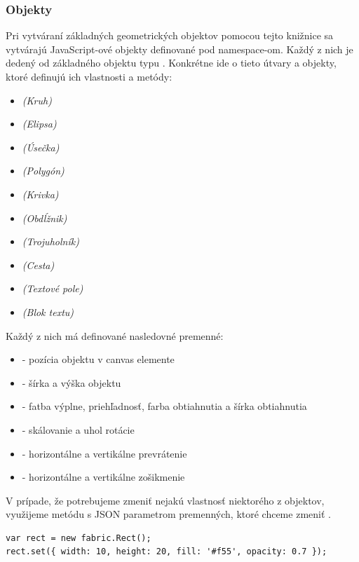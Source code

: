 \subsubsection{Objekty}
Pri vytváraní základných geometrických objektov pomocou tejto knižnice sa vytvárajú JavaScript-ové objekty definované pod  namespace-om. Každý z nich je dedený od základného  objektu typu . Konkrétne ide o tieto útvary a objekty, ktoré definujú ich vlastnosti a metódy:

\begin{itemize}
	\item {} \textit{(Kruh)} 
	\item {} \textit{(Elipsa)}
	\item {} \textit{(Úsečka)}
	\item {} \textit{(Polygón)}
	\item {} \textit{(Krivka)}
	\item {} \textit{(Obdĺžnik)}
	\item {} \textit{(Trojuholník)}
	\item {} \textit{(Cesta)}
	\item {} \textit{(Textové pole)}
	\item {} \textit{(Blok textu)}	
\end{itemize}  
Každý z nich má definované nasledovné premenné:
\begin{itemize}
	\item {} - pozícia objektu v canvas elemente 
	\item {} - šírka a výška objektu
	\item {} - fatba výplne, priehľadnosť, farba obtiahnutia a šírka obtiahnutia
	\item {} - skálovanie a uhol rotácie
	\item {} - horizontálne a vertikálne prevrátenie
	\item {} - horizontálne a vertikálne zošikmenie
\end{itemize}
V prípade, že potrebujeme zmeniť nejakú vlastnosť niektorého z objektov, využijeme metódu  s JSON parametrom premenných, ktoré chceme zmeniť .

\begin{lstlisting}[style=web,caption={Vytvorenie objektu typu obdĺžnik pomocou knižnice FabriJS a zmena jeho základných vlastností},captionpos=b, label={lst:fabric.set}]
var rect = new fabric.Rect(); 
rect.set({ width: 10, height: 20, fill: '#f55', opacity: 0.7 }); 
\end{lstlisting}


